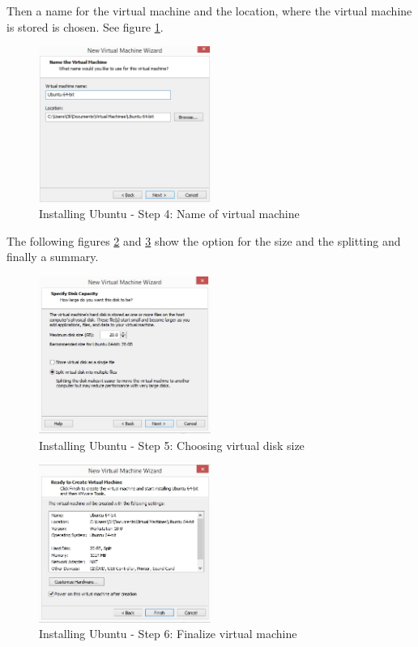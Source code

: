 Then a name for the virtual machine and the location, where the virtual machine is stored is chosen. See figure \ref{fig:Ub4}.

\begin{figure}[H]
	\centering\includegraphics[width=0.5\textwidth]{fig/Dev_Concept/Ub4.jpg}
	\caption{Installing Ubuntu - Step 4: Name of virtual machine}
	\label{fig:Ub4}
\end{figure}

The following figures \ref{fig:Ub5} and \ref{fig:Ub6} show the option for the size and the splitting and finally a summary.

\begin{figure}[H]
	\centering\includegraphics[width=0.5\textwidth]{fig/Dev_Concept/Ub5.jpg}
	\caption{Installing Ubuntu - Step 5: Choosing virtual disk size}
	\label{fig:Ub5}
\end{figure}

\begin{figure}[H]
	\centering\includegraphics[width=0.5\textwidth]{fig/Dev_Concept/Ub6.jpg}
	\caption{Installing Ubuntu - Step 6: Finalize virtual machine}
	\label{fig:Ub6}
\end{figure}


